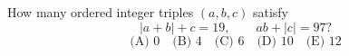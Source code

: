 How many ordered integer triples $(a,b,c)$ satisfy
\[
|a+b|+c=19,\qquad ab+|c|=97?
\]
\[
\text{(A) }0\quad\text{(B) }4\quad\text{(C) }6\quad
\text{(D) }10\quad\text{(E) }12
\]
